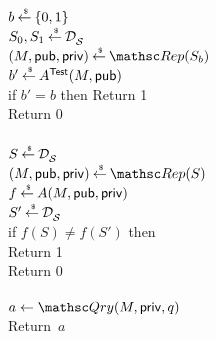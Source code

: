 \begin{figure}[htbp]
\centering
{}
%
{
{
\\
$b \getsr \bits$\\
$S_0,S_1 \getsr \distr{\calS}{}$\\
$(M,\pubaux,\privaux) \getsr \Rep(S_b)$\\
$b' \getsr A^{\TestOracle}(M,\pubaux)$\\
if $b' = b$ then Return 1\\
Return 0\\

\medskip
{}\\
$S\getsr \distr{\calS}{}$\\
$(M,\pubaux,\privaux) \getsr \Rep(S)$\\
$f \getsr A(M,\pubaux,\privaux)$\\
$S' \getsr \distr{\calS}{}$\\
if $f(S) \neq f(S')$ then\\
\nudge Return 1\\
Return 0\\
}
%
{
\\
$a \gets \Qry(M,\privaux,q)$\\
Return~$a$\\

}}
\end{figure}

